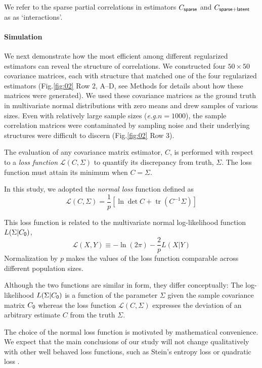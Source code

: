 \documentclass[10pt]{article}
\DeclareMathOperator{\Tr}{tr}
\newcommand{\sq}[1]{\lq#1\rq}
\newcommand{\figref}[2]{Fig.\;\ref{fig:#1}\,#2}
\newcommand{\loss}[1]{\mathcal L\left(#1\right)}
\newcommand{\eg}{\emph{e.g.}\;}
\begin{document}
We refer to the sparse partial correlations in estimators $C_{\sf sparse}$ and $C_{\sf sparse+latent}$ as as \sq{interactions}.

\paragraph{Simulation}
We next demonstrate how the most efficient among different regularized estimators can reveal the structure of correlations.
We constructed four $50\times 50$ covariance matrices, each with structure that matched one of the four regularized estimators (\figref{02}{\,Row 2, A--D}, see Methods for details about how these matrices were generated).  We used these covariance matrices as the ground truth in multivariate normal distributions with zero means and drew samples of various sizes. Even with relatively large sample sizes (\eg $n=1000$), the sample correlation matrices were contaminated by sampling noise and their underlying structures were difficult to discern (\figref{02}{\,Row 3}). 

The evaluation of any covariance matrix estimator, $C$, is performed with respect to a \emph{loss function} $\loss{C,\Sigma}$ to quantify its discrepancy from truth, $\Sigma$.  The loss function must attain its minimum when $C=\Sigma$.

In this study, we adopted the \emph{normal loss} function defined as
\begin{equation}\label{eq:loss}
    \loss{C,\Sigma} = \frac 1 p\left[\ln \det C + \Tr(C^{-1}\Sigma)\right]
\end{equation}

This loss function is related to the multivariate normal log-likelihood function $L(\Sigma|C_{\sf 0})$,
\begin{equation}
     \loss{X,Y} \equiv -\ln(2\pi) - \frac 2 p L(X|Y)
\end{equation}
Normalization by $p$ makes the values of the loss function comparable across different population sizes. 

Although the two functions are similar in form, they differ conceptually: The log-likelihood $L(\Sigma|C_{\sf 0})$ is a function of the parameter $\Sigma$ given the sample covariance matrix $C_{\sf 0}$ whereas the loss function $\loss{C,\Sigma}$ expresses the deviation of an arbitrary estimate $C$ from the truth $\Sigma$.

The choice of the normal loss function is motivated by mathematical convenience. We expect that the main conclusions of our study will not change qualitatively with other well behaved loss functions, such as Stein's entropy loss or quadratic loss \cite{James:1961, Fan:2008, Ledoit:2004, Schafer:2005}.  
\end{document}
